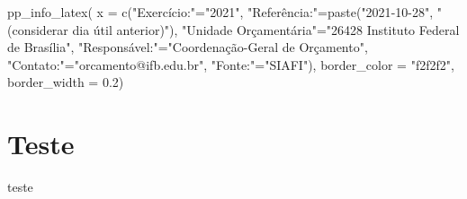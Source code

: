 \documentclass[
]{article}
\newenvironment{Shaded}{\begin{snugshade}}{\end{snugshade}}
\newcommand{\AttributeTok}[1]{\textcolor[rgb]{0.77,0.63,0.00}{#1}}
\newcommand{\FloatTok}[1]{\textcolor[rgb]{0.00,0.00,0.81}{#1}}
\newcommand{\FunctionTok}[1]{\textcolor[rgb]{0.00,0.00,0.00}{#1}}
\newcommand{\NormalTok}[1]{#1}
\newcommand{\OtherTok}[1]{\textcolor[rgb]{0.56,0.35,0.01}{#1}}
\newcommand{\StringTok}[1]{\textcolor[rgb]{0.31,0.60,0.02}{#1}}
\begin{document}
\begin{Shaded}
\begin{Highlighting}[]
\FunctionTok{pp\_info\_latex}\NormalTok{(}
  \AttributeTok{x =} \FunctionTok{c}\NormalTok{(}\StringTok{"Exercício:"}\OtherTok{=}\StringTok{"2021"}\NormalTok{,}
        \StringTok{"Referência:"}\OtherTok{=}\FunctionTok{paste}\NormalTok{(}\StringTok{"2021{-}10{-}28"}\NormalTok{, }\StringTok{"(considerar dia útil anterior)"}\NormalTok{),}
        \StringTok{"Unidade Orçamentária"}\OtherTok{=}\StringTok{"26428 Instituto Federal de Brasília"}\NormalTok{,}
        \StringTok{"Responsável:"}\OtherTok{=}\StringTok{"Coordenação{-}Geral de Orçamento"}\NormalTok{,}
        \StringTok{"Contato:"}\OtherTok{=}\StringTok{"orcamento@ifb.edu.br"}\NormalTok{,}
        \StringTok{"Fonte:"}\OtherTok{=}\StringTok{"SIAFI"}\NormalTok{),}
  \AttributeTok{border\_color =} \StringTok{"f2f2f2"}\NormalTok{,}
  \AttributeTok{border\_width =} \FloatTok{0.2}\NormalTok{)}
\end{Highlighting}
\end{Shaded}

\vfill{}\linebreak\color{colline}{\rule{\linewidth}{0.2mm}}\linebreak\textcolor{black}{}\linebreak\textcolor{black}{}\linebreak\textcolor{black}{}\linebreak\textcolor{black}{}\linebreak\textcolor{black}{}\linebreak\textcolor{black}{}\linebreak\color{colline}{\rule{\linewidth}{0.2mm}}\color{black}

\hypertarget{teste}{%
\section{Teste}\label{teste}}

teste
\end{document}
